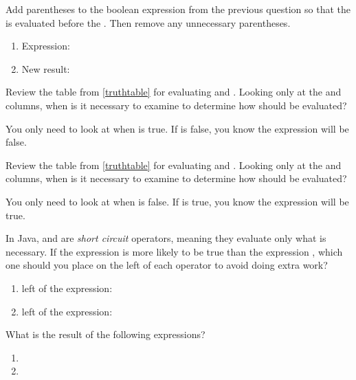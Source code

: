 \Q Add parentheses to the boolean expression from the previous question so that the \java{&&} is evaluated before the \java{!}. Then remove any unnecessary parentheses.

\begin{enumerate}
\item Expression: 
\item New result: 
\end{enumerate}


\Q Review the table from \ref{truthtable} for evaluating \java{&&} and \java{||}.
Looking only at the  and \java{&&} columns, when is it necessary to examine  to determine how  should be evaluated?

\begin{answer}
You only need to look at  when  is true.
If  is false, you know the expression will be false.
\end{answer}


\Q Review the table from \ref{truthtable} for evaluating \java{&&} and \java{||}.
Looking only at the  and \java{||} columns, when is it necessary to examine  to determine how  should be evaluated?

\begin{answer}
You only need to look at  when  is false.
If  is true, you know the expression will be true.
\end{answer}


\Q In Java, \java{&&} and \java{||} are \emph{short circuit} operators, meaning they evaluate only what is necessary.
If the expression  is more likely to be true than the expression , which one should you place on the left of each operator to avoid doing extra work?

\begin{enumerate}
\item left of the \java{&&} expression: 
\item left of the \java{||} expression: 
\end{enumerate}


\Q What is the result of the following expressions?
\begin{enumerate}
\item {} 
\item {} 
\end{enumerate}
